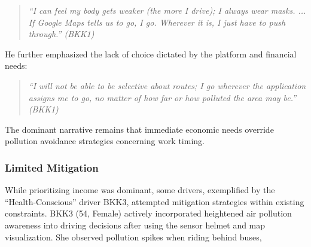 \begin{quote}
  \em
    ``I can feel my body gets weaker (the more I drive); I always wear masks. ... If Google Maps tells us to go, I go. Wherever it is, I just have to push through.'' (BKK1)
\end{quote}

He further emphasized the lack of choice dictated by the platform and financial needs:

\begin{quote}
  \em
    ``I will not be able to be selective about routes; I go wherever the application assigns me to go, no matter of how far or how polluted the area may be.'' (BKK1)
\end{quote}



The dominant narrative remains that immediate economic needs override pollution avoidance strategies concerning work timing.

\subsubsection{Limited Mitigation}
While prioritizing income was dominant, some drivers, exemplified by the ``Health-Conscious'' driver BKK3, attempted mitigation strategies within existing constraints.
BKK3 (54, Female) actively incorporated heightened air pollution awareness into driving decisions after using the sensor helmet and map visualization.
She observed pollution spikes when riding behind buses,

